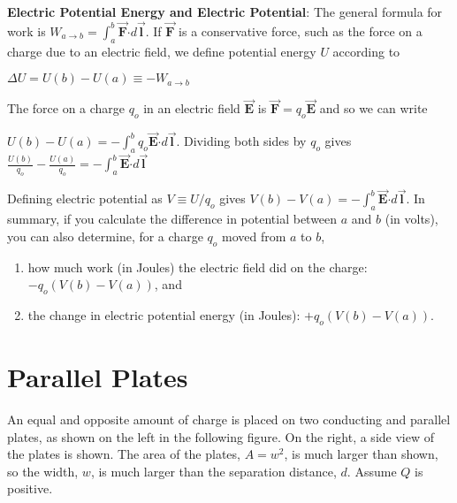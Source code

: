\documentclass{article}
\newcommand{\ds}[0]{\displaystyle}
\newcommand{\bfvec}[1]{\vec{\mathbf{#1}}}
\newcommand{\bfcdot}[0]{\boldsymbol{\cdot}}
\begin{document}
\textbf{Electric Potential Energy and Electric Potential}: The general formula for work is $W_{a\rightarrow b}=\int_a^b \bfvec{F}\bfcdot d\bfvec{l}$. If $\bfvec{F}$ is a conservative force, such as the force on a charge due to an electric field, we define potential energy $U$ according to

$\Delta U = U(b)-U(a) \equiv -W_{a\rightarrow b}$

The force on a charge $q_o$ in an electric field $\bfvec{E}$ is $\bfvec{F}=q_o\bfvec{E}$ and so we can write

$\ds U(b)-U(a) = -\int_a^b q_o\bfvec{E}\bfcdot d\bfvec{l}$. Dividing both sides by $q_o$ gives $\ds\frac{U(b)}{q_o}-\frac{U(a)}{q_o} = -\int_a^b\bfvec{E}\bfcdot d\bfvec{l}$

Defining electric potential as $V\equiv U/q_o$ gives $V(b)-V(a) = -\int_a^b\bfvec{E}\bfcdot d\bfvec{l}$. In summary, if you calculate the difference in potential between $a$ and $b$ (in volts), you can also determine, for a charge $q_o$ moved from $a$ to $b$,

\begin{enumerate}

  \item how much work (in Joules) the electric field did on the charge: $-q_o(V(b)-V(a))$, and

  \item the change in electric potential energy (in Joules): $+q_o(V(b)-V(a))$.

\end{enumerate}

\section{Parallel Plates}

An equal and opposite amount of charge is placed on two conducting and parallel plates, as shown on the left in the following figure. On the right, a side view of the plates is shown. The area of the plates, $A = w^2$, is much larger than shown, so the width, $w$, is much larger than the separation distance, $d$. Assume $Q$ is positive.


\end{document}

